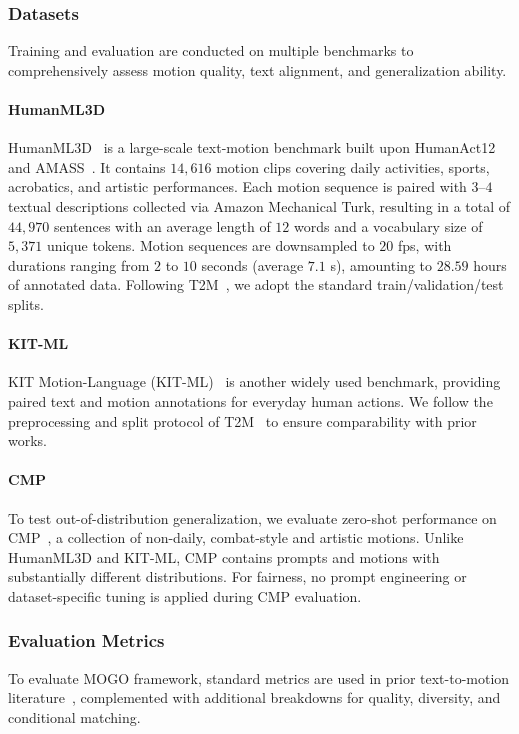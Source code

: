 \documentclass[a4paper,12pt]{article}
\begin{document}
\subsubsection{Datasets} 
Training and evaluation are conducted on multiple benchmarks to comprehensively assess motion quality, text alignment, and generalization ability.

\paragraph{HumanML3D}
HumanML3D~\cite{Guo_2022_CVPR} is a large-scale text-motion benchmark built upon HumanAct12~\cite{guo2020action2motion} and AMASS~\cite{AMASS:2019}. It contains $14,616$ motion clips covering daily activities, sports, acrobatics, and artistic performances. Each motion sequence is paired with $3$–$4$ textual descriptions collected via Amazon Mechanical Turk, resulting in a total of $44,970$ sentences with an average length of $12$ words and a vocabulary size of $5,371$ unique tokens. Motion sequences are downsampled to $20$ fps, with durations ranging from $2$ to $10$ seconds (average $7.1$ s), amounting to $28.59$ hours of annotated data. Following T2M~\cite{guo2022generating}, we adopt the standard train/validation/test splits.

\paragraph{KIT-ML}
KIT Motion-Language (KIT-ML)~\cite{plappert2016kitkit} is another widely used benchmark, providing paired text and motion annotations for everyday human actions. We follow the preprocessing and split protocol of T2M~\cite{guo2022generating} to ensure comparability with prior works.

\paragraph{CMP}
To test out-of-distribution generalization, we evaluate zero-shot performance on CMP~\cite{yihaoanimationgpt}, a collection of non-daily, combat-style and artistic motions. Unlike HumanML3D and KIT-ML, CMP contains prompts and motions with substantially different distributions. For fairness, no prompt engineering or dataset-specific tuning is applied during CMP evaluation.

\subsubsection{Evaluation Metrics}
To evaluate MOGO framework, standard metrics are used in prior text-to-motion literature~\cite{guo2022generating}, complemented with additional breakdowns for quality, diversity, and conditional matching.
\end{document}
